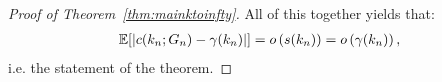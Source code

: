 \begin{proof}[Proof of Theorem~\ref{thm:mainktoinfty}]
All of this together yields that:
\begin{align*}
    \mathbb{E}[|c(k_n;G_n)-\gamma(k_n)|] = o\left(s(k_n)\right) = o\left(\gamma(k_n)\right),
\end{align*}
i.e. the statement of the theorem.

\end{proof}


